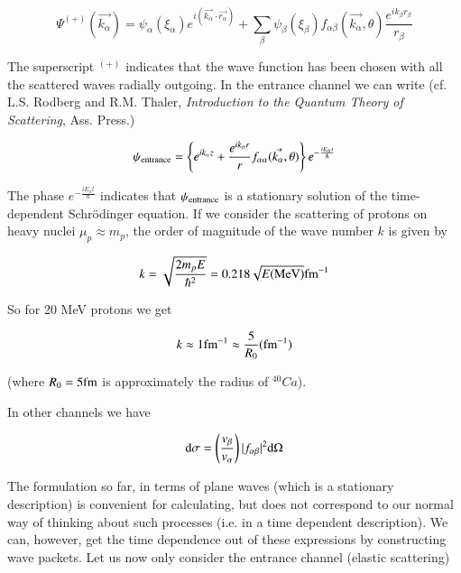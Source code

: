 \documentclass[a4paper,14pt]{book}
\begin{document}
\begin{equation}\label{eq2nd_2}
\Psi^{(+)}(\vec{k_{\alpha}}) = \psi_{\alpha}(\xi_{\alpha})e^{i(\vec{k_{\alpha}} \cdot \vec{r_{\alpha}})} + \sum_{\beta} \psi_{\beta} (\xi_{\beta}) f_{\alpha \beta}(\vec{k_{\alpha}},\theta) \frac{e^{i k_{\beta} r_{\beta}}}{r_{\beta}}
\end{equation}

\noindent The superscript $^{(+)}$ indicates that the wave function has been chosen with all the scattered waves radially outgoing. In the entrance channel we can write (cf. L.S. Rodberg and R.M. Thaler, {\it Introduction to the Quantum Theory of Scattering}, Ass. Press.)

\begin{equation}
\psi_{\rm entrance} = \left\{ e^{i k_{\alpha} z} + \frac{e^{i k_{\alpha} r}}{r} f_{\alpha \alpha}(\vec{k_{\alpha}}, \theta) \right\} e^{-\frac{i E_{\alpha} t}{\hbar}}
\end{equation}

\noindent The phase $e^{-\frac{i E_{\alpha} t}{\hbar}}$ indicates that $\psi_{\rm entrance}$ is a stationary solution of the time-dependent Schr\"odinger equation. If we consider the scattering of protons on heavy nuclei $\mu_p \approx m_p$, the order of magnitude of the wave number $k$ is given by

\begin{equation}
k = \sqrt{\frac{2 m_p E}{\hbar^2}} = 0.218 \sqrt{E({\rm MeV})} {\rm fm}^{-1}
\end{equation}

\noindent So for 20 MeV protons we get

\begin{equation}
k \approx 1 {\rm fm}^{-1} \approx \frac{5}{R_0} ({\rm fm}^{-1})
\end{equation}

 (where $R_0 = 5 {\rm fm}$ is approximately the radius of $^{40}Ca$).

In other channels we have

\begin{equation}\label{eq2nd_3}
{\rm d}\sigma = \left( \frac{v_{\beta}}{v_{\alpha}} \right) |f_{\alpha \beta}|^2 {\rm d}\Omega
\end{equation}

The formulation so far, in terms of plane waves (which is a stationary description) is convenient for calculating, but does not correspond to our normal way of thinking about such processes (i.e. in a time dependent description). We can, however, get the time dependence out of these expressions by constructing wave packets. Let us now only consider the entrance channel (elastic scattering)
\end{document}
